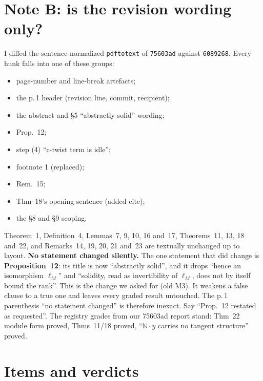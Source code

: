 \documentclass[11pt]{article}
\newcommand{\N}{\mathbb{N}}
\begin{document}
\section{Note B: is the revision wording only?}
I diffed the sentence-normalized \texttt{pdftotext} of \texttt{75603ad} against \texttt{6089268}.
Every hunk falls into one of these groups:
\begin{itemize}[leftmargin=1.2em]
\item page-number and line-break artefacts;
\item the p.\,1 header (revision line, commit, recipient);
\item the abstract and \S5 ``abstractly solid'' wording;
\item Prop.~12;
\item step (4) ``c-twist term is idle'';
\item footnote 1 (replaced);
\item Rem.~15;
\item Thm~18's opening sentence (added cite);
\item the \S8 and \S9 scoping.
\end{itemize}
Theorem~1, Definition~4, Lemmas~7, 9, 10, 16 and~17, Theorems~11, 13, 18 and~22, and
Remarks~14, 19, 20, 21 and~23 are textually unchanged up to layout. \textbf{No statement changed
silently.} The one statement that did change is \textbf{Proposition~12}: its title is now ``abstractly
solid'', and it drops ``hence an isomorphism $\ell_M$'' and ``solidity, read as invertibility of
$\ell_M$, does not by itself bound the rank''. This is the change we asked for (old M3). It weakens a
false clause to a true one and leaves every graded result untouched. The p.\,1 parenthesis ``no
statement changed'' is therefore inexact. Say ``Prop.~12 restated as requested''. The registry grades
from our 75603ad report stand: Thm~22 module form proved, Thms~11/18 proved, ``$\N\cdot y$ carries no
tangent structure'' proved.

\section{Items and verdicts}
\end{document}
